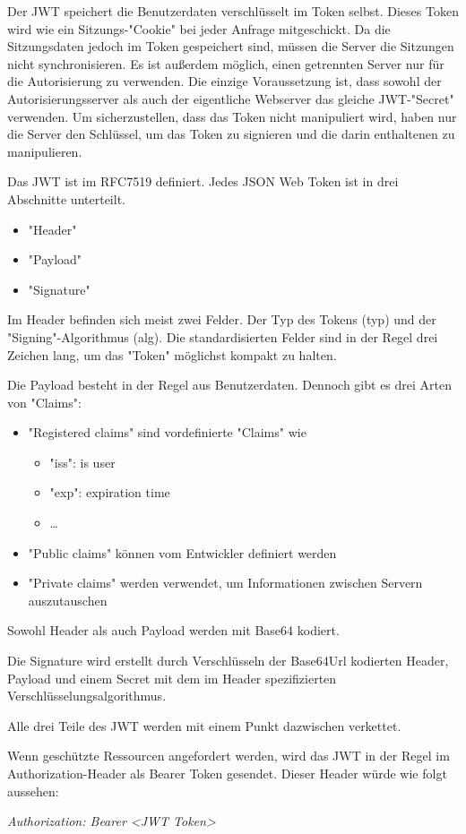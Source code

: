 
Der JWT speichert die Benutzerdaten verschlüsselt im Token selbst. Dieses Token wird wie ein Sitzungs-"Cookie" bei jeder Anfrage mitgeschickt. Da die Sitzungsdaten jedoch im Token gespeichert sind, müssen die Server die Sitzungen nicht synchronisieren. Es ist außerdem möglich, einen getrennten Server nur für die Autorisierung zu verwenden. Die einzige Voraussetzung ist, dass sowohl der Autorisierungsserver als auch der eigentliche Webserver das gleiche JWT-"Secret" verwenden. Um sicherzustellen, dass das Token nicht manipuliert wird, haben nur die Server den Schlüssel, um das Token zu signieren und die darin enthaltenen zu manipulieren. 

Das JWT ist im RFC7519 definiert. Jedes JSON Web Token ist in drei Abschnitte unterteilt. 

\begin{itemize}
    \item "Header"
    \item "Payload"
    \item "Signature"
\end{itemize}

Im Header befinden sich meist zwei Felder. Der Typ des Tokens (typ) und der "Signing"-Algorithmus (alg). Die standardisierten Felder sind in der Regel drei Zeichen lang, um das "Token" möglichst kompakt zu halten.

Die Payload besteht in der Regel aus Benutzerdaten. Dennoch gibt es drei Arten von "Claims": 

\begin{itemize}
    \item "Registered claims" sind vordefinierte "Claims" wie
    \begin{itemize}
        \item "iss": is user
        \item "exp":  expiration time
        \item …
    \end{itemize}
    \item "Public claims" können vom Entwickler definiert werden
    \item "Private claims" werden verwendet, um Informationen zwischen Servern auszutauschen
\end{itemize}

Sowohl Header als auch Payload werden mit Base64 kodiert.

Die Signature wird erstellt durch Verschlüsseln der Base64Url kodierten Header, Payload und einem Secret mit dem im Header spezifizierten Verschlüsselungsalgorithmus.

Alle drei Teile des JWT werden mit einem Punkt dazwischen verkettet. 

Wenn geschützte Ressourcen angefordert werden, wird das JWT in der Regel im Authorization-Header als Bearer Token gesendet. Dieser Header würde wie folgt aussehen:

\emph{Authorization: Bearer \textless JWT Token\textgreater}

\cite{Auth0JWT}
\cite{RFC7519}
\cite{WdsJWT}